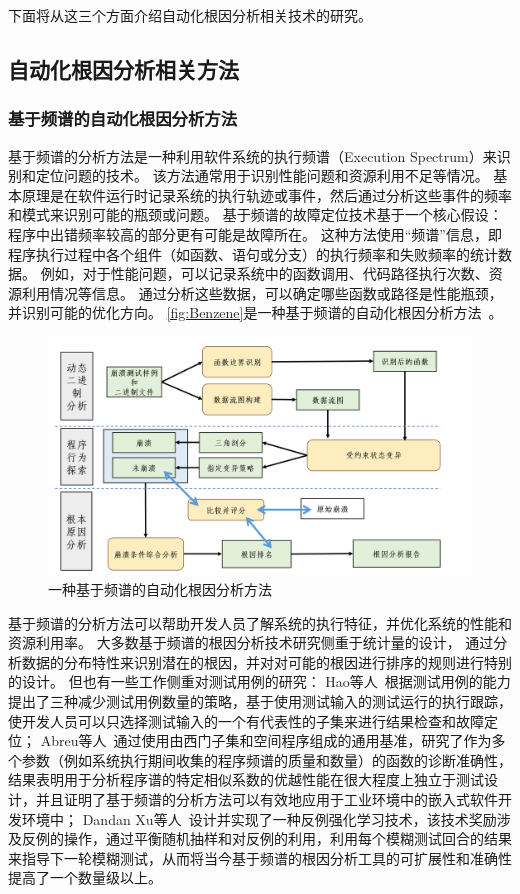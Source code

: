 下面将从这三个方面介绍自动化根因分析相关技术的研究。
\subsection{自动化根因分析相关方法}
\subsubsection{基于频谱的自动化根因分析方法}
基于频谱的分析方法是一种利用软件系统的执行频谱（Execution Spectrum）来识别和定位问题的技术。
该方法通常用于识别性能问题和资源利用不足等情况。
基本原理是在软件运行时记录系统的执行轨迹或事件，然后通过分析这些事件的频率和模式来识别可能的瓶颈或问题。
基于频谱的故障定位技术基于一个核心假设：程序中出错频率较高的部分更有可能是故障所在。
这种方法使用“频谱”信息，即程序执行过程中各个组件（如函数、语句或分支）的执行频率和失败频率的统计数据。
例如，对于性能问题，可以记录系统中的函数调用、代码路径执行次数、资源利用情况等信息。
通过分析这些数据，可以确定哪些函数或路径是性能瓶颈，并识别可能的优化方向。
\autoref{fig:Benzene}是一种基于频谱的自动化根因分析方法~\cite{BENZENE}。
\begin{figure}[h]
    \centering
    \includegraphics[width=1.0\textwidth]{./figure/Benzene.png}
    \caption{一种基于频谱的自动化根因分析方法}
    \label{fig:Benzene}
\end{figure}


基于频谱的分析方法可以帮助开发人员了解系统的执行特征，并优化系统的性能和资源利用率。
大多数基于频谱的根因分析技术研究侧重于统计量的设计，
通过分析数据的分布特性来识别潜在的根因，并对对可能的根因进行排序的规则进行特别的设计。
但也有一些工作侧重对测试用例的研究：
Hao等人~\cite{Test2010}根据测试用例的能力提出了三种减少测试用例数量的策略，基于使用测试输入的测试运行的执行跟踪，使开发人员可以只选择测试输入的一个有代表性的子集来进行结果检查和故障定位；
Abreu等人~\cite{practical2009}通过使用由西门子集和空间程序组成的通用基准，研究了作为多个参数（例如系统执行期间收集的程序频谱的质量和数量）的函数的诊断准确性，结果表明用于分析程序谱的特定相似系数的优越性能在很大程度上独立于测试设计，并且证明了基于频谱的分析方法可以有效地应用于工业环境中的嵌入式软件开发环境中；
Dandan Xu等人~\cite{Racing}设计并实现了一种反例强化学习技术，该技术奖励涉及反例的操作，通过平衡随机抽样和对反例的利用，利用每个模糊测试回合的结果来指导下一轮模糊测试，从而将当今基于频谱的根因分析工具的可扩展性和准确性提高了一个数量级以上。

